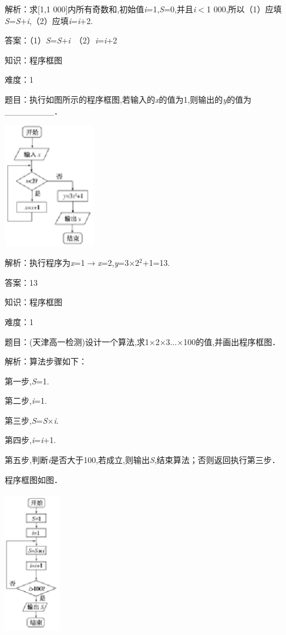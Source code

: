 \documentclass{article} %
\begin{document}
解析：求[1,1 000]内所有奇数和,初始值\textit{i}=1,\textit{S}=0,并且\textit{i}$\mathrm{<}$1 000,所以（1）应填\textit{S}=\textit{S}+\textit{i},（2）应填\textit{i}=\textit{i}+2.

答案：（1）\textit{S}=\textit{S}+\textit{i}　（2）\textit{i}=\textit{i}+2

知识：程序框图

难度：1

题目：执行如图所示的程序框图,若输入的\textit{x}的值为1,则输出的\textit{y}的值为\_\_\_\_\_\_\_\_．

\includegraphics*[width=1.59in, height=2.15in, keepaspectratio=false]{image21}

解析：执行程序为\textit{x}=1$\mathrm{\to}$\textit{x}=2,\textit{y}=3$\mathrm{\times}$2${}^{2}$+1=13.

答案：13



知识：程序框图

难度：1

题目：(天津高一检测)设计一个算法,求1$\mathrm{\times}$2$\mathrm{\times}$3$\dots$$\mathrm{\times}$100的值,并画出程序框图．

解析：算法步骤如下：

第一步,\textit{S}=1.

第二步,\textit{i}=1.

第三步,\textit{S}=\textit{S}$\mathrm{\times}$\textit{i}.

第四步,\textit{i}=\textit{i}+1.

第五步,判断\textit{i}是否大于100,若成立,则输出\textit{S},结束算法；否则返回执行第三步．

程序框图如图．

\includegraphics*[width=0.97in, height=2.46in, keepaspectratio=false]{image22}
\end{document}
